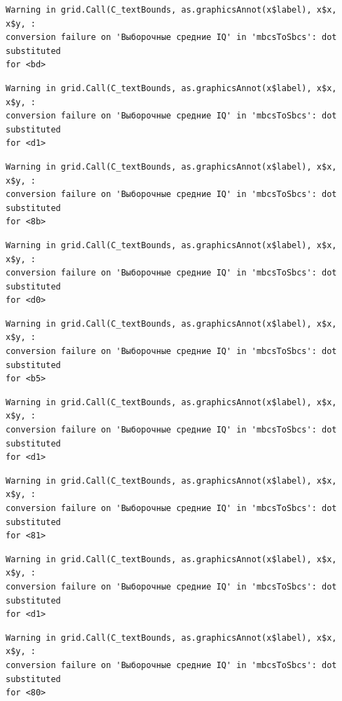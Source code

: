 \documentclass[
  letterpaper,
  DIV=11,
  numbers=noendperiod]{scrreprt}
\theoremstyle{definition}
\theoremstyle{remark}
\begin{document}
\begin{verbatim}
Warning in grid.Call(C_textBounds, as.graphicsAnnot(x$label), x$x, x$y, :
conversion failure on 'Выборочные средние IQ' in 'mbcsToSbcs': dot substituted
for <bd>
\end{verbatim}

\begin{verbatim}
Warning in grid.Call(C_textBounds, as.graphicsAnnot(x$label), x$x, x$y, :
conversion failure on 'Выборочные средние IQ' in 'mbcsToSbcs': dot substituted
for <d1>
\end{verbatim}

\begin{verbatim}
Warning in grid.Call(C_textBounds, as.graphicsAnnot(x$label), x$x, x$y, :
conversion failure on 'Выборочные средние IQ' in 'mbcsToSbcs': dot substituted
for <8b>
\end{verbatim}

\begin{verbatim}
Warning in grid.Call(C_textBounds, as.graphicsAnnot(x$label), x$x, x$y, :
conversion failure on 'Выборочные средние IQ' in 'mbcsToSbcs': dot substituted
for <d0>
\end{verbatim}

\begin{verbatim}
Warning in grid.Call(C_textBounds, as.graphicsAnnot(x$label), x$x, x$y, :
conversion failure on 'Выборочные средние IQ' in 'mbcsToSbcs': dot substituted
for <b5>
\end{verbatim}

\begin{verbatim}
Warning in grid.Call(C_textBounds, as.graphicsAnnot(x$label), x$x, x$y, :
conversion failure on 'Выборочные средние IQ' in 'mbcsToSbcs': dot substituted
for <d1>
\end{verbatim}

\begin{verbatim}
Warning in grid.Call(C_textBounds, as.graphicsAnnot(x$label), x$x, x$y, :
conversion failure on 'Выборочные средние IQ' in 'mbcsToSbcs': dot substituted
for <81>
\end{verbatim}

\begin{verbatim}
Warning in grid.Call(C_textBounds, as.graphicsAnnot(x$label), x$x, x$y, :
conversion failure on 'Выборочные средние IQ' in 'mbcsToSbcs': dot substituted
for <d1>
\end{verbatim}

\begin{verbatim}
Warning in grid.Call(C_textBounds, as.graphicsAnnot(x$label), x$x, x$y, :
conversion failure on 'Выборочные средние IQ' in 'mbcsToSbcs': dot substituted
for <80>
\end{verbatim}
\end{document}
